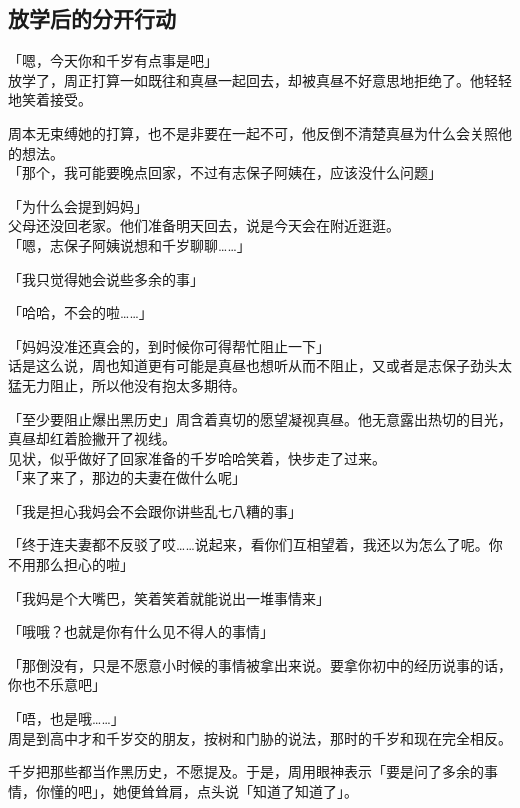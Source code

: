 \subsection{放学后的分开行动}

「嗯，今天你和千岁有点事是吧」\\

放学了，周正打算一如既往和真昼一起回去，却被真昼不好意思地拒绝了。他轻轻地笑着接受。

周本无束缚她的打算，也不是非要在一起不可，他反倒不清楚真昼为什么会关照他的想法。\\

「那个，我可能要晚点回家，不过有志保子阿姨在，应该没什么问题」

「为什么会提到妈妈」\\

父母还没回老家。他们准备明天回去，说是今天会在附近逛逛。\\

「嗯，志保子阿姨说想和千岁聊聊……」

「我只觉得她会说些多余的事」

「哈哈，不会的啦……」

「妈妈没准还真会的，到时候你可得帮忙阻止一下」\\

话是这么说，周也知道更有可能是真昼也想听从而不阻止，又或者是志保子劲头太猛无力阻止，所以他没有抱太多期待。

「至少要阻止爆出黑历史」周含着真切的愿望凝视真昼。他无意露出热切的目光，真昼却红着脸撇开了视线。\\

见状，似乎做好了回家准备的千岁哈哈笑着，快步走了过来。\\

「来了来了，那边的夫妻在做什么呢」

「我是担心我妈会不会跟你讲些乱七八糟的事」

「终于连夫妻都不反驳了哎……说起来，看你们互相望着，我还以为怎么了呢。你不用那么担心的啦」

「我妈是个大嘴巴，笑着笑着就能说出一堆事情来」

「哦哦？也就是你有什么见不得人的事情」

「那倒没有，只是不愿意小时候的事情被拿出来说。要拿你初中的经历说事的话，你也不乐意吧」

「唔，也是哦……」\\

周是到高中才和千岁交的朋友，按树和门胁的说法，那时的千岁和现在完全相反。

千岁把那些都当作黑历史，不愿提及。于是，周用眼神表示「要是问了多余的事情，你懂的吧」，她便耸耸肩，点头说「知道了知道了」。\\

